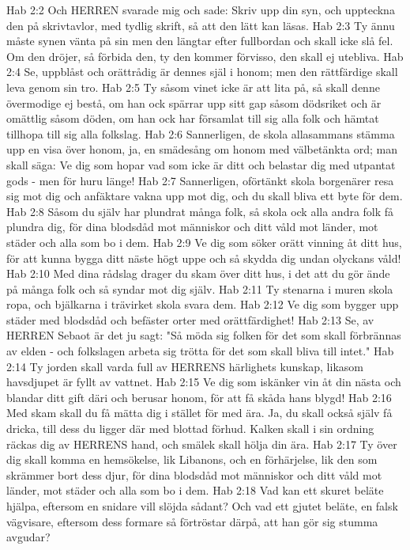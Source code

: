 Hab 2:2  Och HERREN svarade mig och sade: Skriv upp din syn, och uppteckna den på skrivtavlor, med tydlig skrift, så att den lätt kan läsas.
Hab 2:3  Ty ännu måste synen vänta på sin men den längtar efter fullbordan och skall icke slå fel. Om den dröjer, så förbida den, ty den kommer förvisso, den skall ej utebliva.
Hab 2:4  Se, uppblåst och orättrådig är dennes själ i honom; men den rättfärdige skall leva genom sin tro.
Hab 2:5  Ty såsom vinet icke är att lita på, så skall denne övermodige ej bestå, om han ock spärrar upp sitt gap såsom dödsriket och är omättlig såsom döden, om han ock har församlat till sig alla folk och hämtat tillhopa till sig alla folkslag.
Hab 2:6  Sannerligen, de skola allasammans stämma upp en visa över honom, ja, en smädesång om honom med välbetänkta ord; man skall säga: Ve dig som hopar vad som icke är ditt och belastar dig med utpantat gods - men för huru länge!
Hab 2:7  Sannerligen, oförtänkt skola borgenärer resa sig mot dig och anfäktare vakna upp mot dig, och du skall bliva ett byte för dem.
Hab 2:8  Såsom du själv har plundrat många folk, så skola ock alla andra folk få plundra dig, för dina blodsdåd mot människor och ditt våld mot länder, mot städer och alla som bo i dem.
Hab 2:9  Ve dig som söker orätt vinning åt ditt hus, för att kunna bygga ditt näste högt uppe och så skydda dig undan olyckans våld!
Hab 2:10  Med dina rådslag drager du skam över ditt hus, i det att du gör ände på många folk och så syndar mot dig själv.
Hab 2:11  Ty stenarna i muren skola ropa, och bjälkarna i trävirket skola svara dem.
Hab 2:12  Ve dig som bygger upp städer med blodsdåd och befäster orter med orättfärdighet!
Hab 2:13  Se, av HERREN Sebaot är det ju sagt: "Så möda sig folken för det som skall förbrännas av elden - och folkslagen arbeta sig trötta för det som skall bliva till intet."
Hab 2:14  Ty jorden skall varda full av HERRENS härlighets kunskap, likasom havsdjupet är fyllt av vattnet.
Hab 2:15  Ve dig som iskänker vin åt din nästa och blandar ditt gift däri och berusar honom, för att få skåda hans blygd!
Hab 2:16  Med skam skall du få mätta dig i stället för med ära. Ja, du skall också själv få dricka, till dess du ligger där med blottad förhud. Kalken skall i sin ordning räckas dig av HERRENS hand, och smälek skall hölja din ära.
Hab 2:17  Ty över dig skall komma en hemsökelse, lik Libanons, och en förhärjelse, lik den som skrämmer bort dess djur, för dina blodsdåd mot människor och ditt våld mot länder, mot städer och alla som bo i dem.
Hab 2:18  Vad kan ett skuret beläte hjälpa, eftersom en snidare vill slöjda sådant? Och vad ett gjutet beläte, en falsk vägvisare, eftersom dess formare så förtröstar därpå, att han gör sig stumma avgudar?
